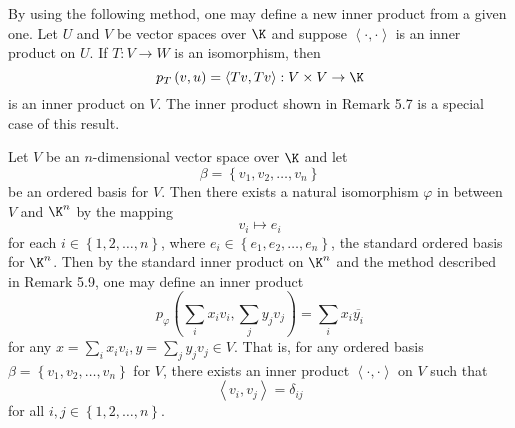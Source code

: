 \documentclass[linearalgebraII]{subfiles}
\begin{document}
    \begin{remark}
        By using the following method, one may define a new inner product from a given one. Let $U$ and $V$ be vector spaces over $\K$ and suppose $\left\langle \cdot, \cdot\right\rangle $ is an inner product on $U$. If $T:V\to W$ is an isomorphism, then
        \begin{equation*}
            p_T\left( v,u \right) = \left\langle Tv, Tv\right\rangle : V\times V\to\K
        \end{equation*}
        is an inner product on $V$. The inner product shown in Remark 5.7 is a special case of this result.
    \end{remark}

    \begin{example}
        Let $V$ be an $n$-dimensional vector space over $\K$ and let
        \begin{equation*}
            \beta = \left\lbrace v_1,v_2,\ldots,v_n \right\rbrace 
        \end{equation*}
        be an ordered basis for $V$. Then there exists a natural isomorphism $\varphi$ in between $V$ and $\K^n$ by the mapping
        \begin{equation*}
            v_i\mapsto e_i
        \end{equation*}
        for each $i\in\left\lbrace 1,2,\ldots,n \right\rbrace$, where $e_i\in\left\lbrace e_1,e_2,\ldots,e_n \right\rbrace$, the standard ordered basis for $\K^n$. Then by the standard inner product on $\K^n$ and the method described in Remark 5.9, one may define an inner product
        \begin{equation*}
            p_\varphi\left( \sum^{}_{i} x_iv_i, \sum^{}_{j} y_jv_j \right) = \sum^{}_{i} x_i\overline{y_i}
        \end{equation*}
        for any $x = \sum^{}_{i} x_iv_i, y = \sum^{}_{j} y_jv_j\in V$. That is, for any ordered basis $\beta = \left\lbrace v_1,v_2,\ldots,v_n \right\rbrace$ for $V$, there exists an inner product $\left\langle \cdot, \cdot\right\rangle $ on $V$ such that
        \begin{equation*}
            \left\langle v_i, v_j\right\rangle  = \delta_{ij}
        \end{equation*}
        for all $i,j\in\left\lbrace 1,2,\ldots,n \right\rbrace$.
    \end{example}
\end{document}
